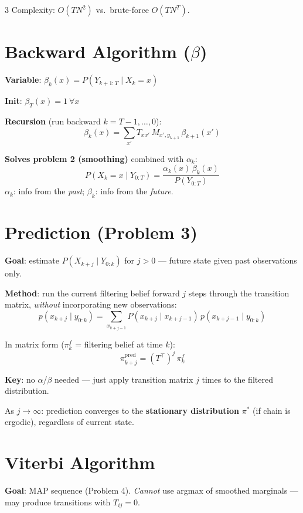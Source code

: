 \documentclass[9pt,landscape]{article}
\begin{document}
\begin{multicols}{3}
Complexity: $O(T N^2)$ vs.\ brute-force $O(T N^T)$.

\section{Backward Algorithm ($\beta$)}

\textbf{Variable}: $\beta_k(x)=P(Y_{k+1:T}\mid X_k=x)$

\textbf{Init}: $\beta_T(x)=1\ \forall x$

\textbf{Recursion} (run backward $k=T-1,\ldots,0$):
\[\boxed{\beta_k(x)=\sum_{x'}T_{xx'}\,M_{x',y_{k+1}}\,\beta_{k+1}(x')}\]

\textbf{Solves problem 2 (smoothing)} combined with $\alpha_k$:
\[\boxed{P(X_k=x\mid Y_{0:T})=\frac{\alpha_k(x)\,\beta_k(x)}{P(Y_{0:T})}}\]
$\alpha_k$: info from the \emph{past}; \quad $\beta_k$: info from the \emph{future}.

\section{Prediction (Problem 3)}

\textbf{Goal}: estimate $P(X_{k+j}\mid Y_{0:k})$ for $j>0$ --- future state given past observations only.

\textbf{Method}: run the current filtering belief forward $j$ steps through the transition matrix, \emph{without} incorporating new observations:
\[p(x_{k+j}\mid y_{0:k})=\sum_{x_{k+j-1}}P(x_{k+j}\mid x_{k+j-1})\,p(x_{k+j-1}\mid y_{0:k})\]

In matrix form ($\pi_k^f$ = filtering belief at time $k$):
\[\boxed{\pi_{k+j}^{\text{pred}}=(T^\top)^j\,\pi_k^f}\]

\textbf{Key}: no $\alpha$/$\beta$ needed --- just apply transition matrix $j$ times to the filtered distribution.

As $j\to\infty$: prediction converges to the \textbf{stationary distribution} $\pi^*$ (if chain is ergodic), regardless of current state.

\section{Viterbi Algorithm}

\textbf{Goal}: MAP sequence (Problem 4). \emph{Cannot} use argmax of smoothed marginals --- may produce transitions with $T_{ij}=0$.


\end{multicols}
\end{document}
